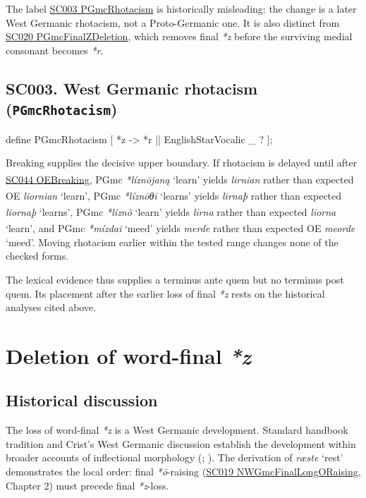 \documentclass[
  british,
  a4paper,
  openany]{book}
\newcounter{none} %
\providecommand{\Pred}[1]{\textsuperscript{\dag}\emph{#1}}
\providecommand{\Recon}[1]{\emph{*#1}}
{\catcode`→=\active \global\def→{\ensuremath{\rightarrow}}}
\providecommand{\texorpdfstring}[2]{#1}
\providecommand{\Pred}[1]{\textsuperscript{\dag}\emph{#1}}
\providecommand{\Recon}[1]{\emph{*#1}}
{\catcode`→=\active \global\def→{\ensuremath{\rightarrow}}}
\begin{document}
The label \hyperref[rule-PGmcRhotacism]{SC003 PGmcRhotacism} is
historically misleading: the change is a later West Germanic rhotacism,
not a Proto-Germanic one. It is also distinct from
\hyperref[rule-PGmcFinalZDeletion]{SC020 PGmcFinalZDeletion}, which
removes final \emph{*z} before the surviving medial consonant becomes
\emph{*r}.

\subsection{\texorpdfstring{SC003. West Germanic rhotacism
(\texttt{PGmcRhotacism})}{SC003. West Germanic rhotacism (PGmcRhotacism)}}\label{rule-PGmcRhotacism}

\begin{ReaderFacingFoma}
define PGmcRhotacism [
    {*z} -> {*r} || EnglishStarVocalic _ ?
];
\end{ReaderFacingFoma}

Breaking supplies the decisive upper boundary. If rhotacism is delayed
until after \hyperref[rule-OEBreaking]{SC044 OEBreaking}, PGmc
\Recon{líznōjaną} `learn' yields \Pred{lirnian} rather than expected OE
\emph{liornian} `learn', PGmc \Recon{líznōθi} `learns' yields
\Pred{lirnaþ} rather than expected \emph{liornaþ} `learns', PGmc
\Recon{líznô} `learn' yields \Pred{lirna} rather than expected
\emph{liorna} `learn', and PGmc \Recon{mízdai} `meed' yields
\Pred{merde} rather than expected OE \emph{meorde} `meed'. Moving
rhotacism earlier within the tested range changes none of the checked
forms.

The lexical evidence thus supplies a terminus ante quem but no terminus
post quem. Its placement after the earlier loss of final \emph{*z} rests
on the historical analyses cited above.

\newpage

\section{\texorpdfstring{Deletion of word-final
\emph{*z}}{Deletion of word-final }}\label{deletion-of-word-final}

\subsection{Historical discussion}\label{historical-discussion-24}

The loss of word-final \emph{*z} is a West Germanic development.
Standard handbook tradition and Crist's West Germanic discussion
establish the development within broader accounts of inflectional
morphology (;
). The derivation of \emph{ræste}
`rest' demonstrates the local order: final \emph{*ō}-raising
(\hyperref[rule-NWGmcFinalLongORaising]{SC019 NWGmcFinalLongORaising},
Chapter 2) must precede final \emph{*z}-loss.
\end{document}
